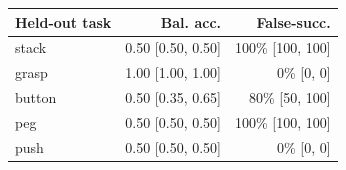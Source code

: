 \begin{tabular}{lrr}
\toprule
Held-out task & Bal. acc. & False-succ. \\
\midrule
stack & 0.50 [0.50, 0.50] & 100\% [100, 100] \\
grasp & 1.00 [1.00, 1.00] & 0\% [0, 0] \\
button & 0.50 [0.35, 0.65] & 80\% [50, 100] \\
peg & 0.50 [0.50, 0.50] & 100\% [100, 100] \\
push & 0.50 [0.50, 0.50] & 0\% [0, 0] \\
\bottomrule
\end{tabular}
